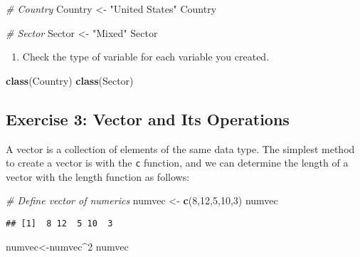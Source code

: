 \documentclass[
]{article}
\newenvironment{Shaded}{\begin{snugshade}}{\end{snugshade}}
\newcommand{\CommentTok}[1]{\textcolor[rgb]{0.56,0.35,0.01}{\textit{#1}}}
\newcommand{\DecValTok}[1]{\textcolor[rgb]{0.00,0.00,0.81}{#1}}
\newcommand{\FunctionTok}[1]{\textcolor[rgb]{0.13,0.29,0.53}{\textbf{#1}}}
\newcommand{\NormalTok}[1]{#1}
\newcommand{\OtherTok}[1]{\textcolor[rgb]{0.56,0.35,0.01}{#1}}
\newcommand{\SpecialCharTok}[1]{\textcolor[rgb]{0.81,0.36,0.00}{\textbf{#1}}}
\newcommand{\StringTok}[1]{\textcolor[rgb]{0.31,0.60,0.02}{#1}}
\providecommand{\tightlist}{%
  \setlength{\itemsep}{0pt}\setlength{\parskip}{0pt}}
\begin{document}
\begin{Shaded}
\begin{Highlighting}[]
\CommentTok{\# Country}
\NormalTok{Country }\OtherTok{\textless{}{-}} \StringTok{"United States"}
\NormalTok{Country}

\CommentTok{\# Sector}
\NormalTok{Sector }\OtherTok{\textless{}{-}} \StringTok{"Mixed"}
\NormalTok{Sector}
\end{Highlighting}
\end{Shaded}

\begin{enumerate}
\def\labelenumi{\arabic{enumi}.}
\setcounter{enumi}{3}
\tightlist
\item
  Check the type of variable for each variable you created.
\end{enumerate}

\begin{Shaded}
\begin{Highlighting}[]
\FunctionTok{class}\NormalTok{(Country)}
\FunctionTok{class}\NormalTok{(Sector)}
\end{Highlighting}
\end{Shaded}

\subsection{Exercise 3: Vector and Its
Operations}\label{exercise-3-vector-and-its-operations}

A vector is a collection of elements of the same data type. The simplest
method to create a vector is with the \texttt{c} function, and we can
determine the length of a vector with the length function as follows:

\begin{Shaded}
\begin{Highlighting}[]
\CommentTok{\# Define vector of numerics}
\NormalTok{numvec }\OtherTok{\textless{}{-}} \FunctionTok{c}\NormalTok{(}\DecValTok{8}\NormalTok{,}\DecValTok{12}\NormalTok{,}\DecValTok{5}\NormalTok{,}\DecValTok{10}\NormalTok{,}\DecValTok{3}\NormalTok{)}
\NormalTok{numvec}
\end{Highlighting}
\end{Shaded}

\begin{verbatim}
## [1]  8 12  5 10  3
\end{verbatim}

\begin{Shaded}
\begin{Highlighting}[]
\NormalTok{numvec}\OtherTok{\textless{}{-}}\NormalTok{numvec}\SpecialCharTok{\^{}}\DecValTok{2}
\NormalTok{numvec}
\end{Highlighting}
\end{Shaded}
\end{document}
